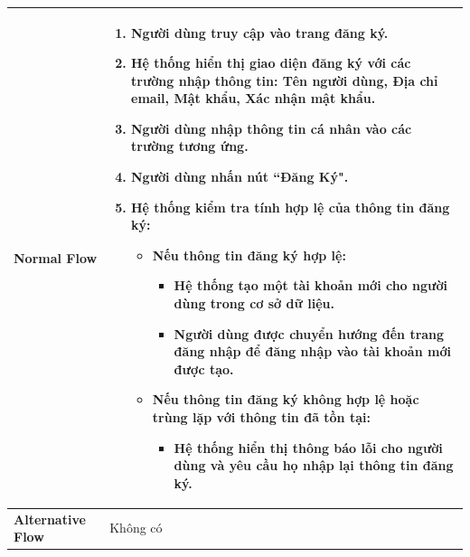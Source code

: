 \begin{longtable}[H]{|l|p{}|}
        \textbf{Normal Flow} & \vspace{-1cm} \begin{enumerate}[leftmargin=5.5mm]
            \setlength\itemsep{0em}
            \item Người dùng truy cập vào trang đăng ký.
            \item Hệ thống hiển thị giao diện đăng ký với các trường nhập thông tin: Tên người dùng, Địa chỉ email, Mật khẩu, Xác nhận mật khẩu.
            \item Người dùng nhập thông tin cá nhân vào các trường tương ứng.
            \item Người dùng nhấn nút ``Đăng Ký".
            \item Hệ thống kiểm tra tính hợp lệ của thông tin đăng ký:
                \begin{itemize}
                    \setlength\itemsep{0em}
                    \item Nếu thông tin đăng ký hợp lệ:
                        \begin{itemize}
                            \setlength\itemsep{0em}
                            \item Hệ thống tạo một tài khoản mới cho người dùng trong cơ sở dữ liệu.
                            \item Người dùng được chuyển hướng đến trang đăng nhập để đăng nhập vào tài khoản mới được tạo.
                        \end{itemize}
                    \item Nếu thông tin đăng ký không hợp lệ hoặc trùng lặp với thông tin đã tồn tại:
                        \begin{itemize}
                            \setlength\itemsep{0em}
                            \item Hệ thống hiển thị thông báo lỗi cho người dùng và yêu cầu họ nhập lại thông tin đăng ký.
                        \end{itemize}
                \end{itemize}
        \end{enumerate}\\
            
        \hline
            
        \textbf{Alternative Flow} & Không có \\
            
        \hline 
            

\end{longtable}
